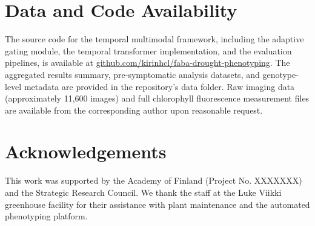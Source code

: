 \documentclass[a4paper,fleqn]{cas-dc}
\begin{document}
\section{Data and Code Availability}\label{sec:data}

The source code for the temporal multimodal framework, including the adaptive gating module, the temporal transformer implementation, and the evaluation pipelines, is available at \href{https://github.com/kirinhcl/faba-drought-phenotyping}{github.com/kirinhcl/faba-drought-phenotyping}. The aggregated results summary, pre-symptomatic analysis datasets, and genotype-level metadata are provided in the repository's data folder. Raw imaging data (approximately 11,600 images) and full chlorophyll fluorescence measurement files are available from the corresponding author upon reasonable request.


\section*{Acknowledgements}

This work was supported by the Academy of Finland (Project No. XXXXXXX) and the Strategic Research Council. We thank the staff at the Luke Viikki greenhouse facility for their assistance with plant maintenance and the automated phenotyping platform.

\printcredits



\end{document}
